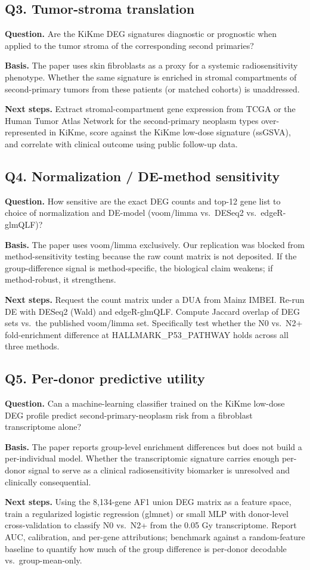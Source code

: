 \subsection*{Q3. Tumor-stroma translation}
\textbf{Question.} Are the KiKme DEG signatures diagnostic or prognostic when applied to the tumor stroma of the corresponding second primaries?

\textbf{Basis.} The paper uses skin fibroblasts as a proxy for a systemic radiosensitivity phenotype. Whether the same signature is enriched in stromal compartments of second-primary tumors from these patients (or matched cohorts) is unaddressed.

\textbf{Next steps.} Extract stromal-compartment gene expression from TCGA or the Human Tumor Atlas Network for the second-primary neoplasm types over-represented in KiKme, score against the KiKme low-dose signature (ssGSVA), and correlate with clinical outcome using public follow-up data.

\subsection*{Q4. Normalization / DE-method sensitivity}
\textbf{Question.} How sensitive are the exact DEG counts and top-12 gene list to choice of normalization and DE-model (voom/limma vs.\ DESeq2 vs.\ edgeR-glmQLF)?

\textbf{Basis.} The paper uses voom/limma exclusively. Our replication was blocked from method-sensitivity testing because the raw count matrix is not deposited. If the group-difference signal is method-specific, the biological claim weakens; if method-robust, it strengthens.

\textbf{Next steps.} Request the count matrix under a DUA from Mainz IMBEI. Re-run DE with DESeq2 (Wald) and edgeR-glmQLF. Compute Jaccard overlap of DEG sets vs.\ the published voom/limma set. Specifically test whether the N0 vs.\ N2+ fold-enrichment difference at HALLMARK\_P53\_PATHWAY holds across all three methods.

\subsection*{Q5. Per-donor predictive utility}
\textbf{Question.} Can a machine-learning classifier trained on the KiKme low-dose DEG profile predict second-primary-neoplasm risk from a fibroblast transcriptome alone?

\textbf{Basis.} The paper reports group-level enrichment differences but does not build a per-individual model. Whether the transcriptomic signature carries enough per-donor signal to serve as a clinical radiosensitivity biomarker is unresolved and clinically consequential.

\textbf{Next steps.} Using the 8{,}134-gene AF1 union DEG matrix as a feature space, train a regularized logistic regression (glmnet) or small MLP with donor-level cross-validation to classify N0 vs.\ N2+ from the 0.05 Gy transcriptome. Report AUC, calibration, and per-gene attributions; benchmark against a random-feature baseline to quantify how much of the group difference is per-donor decodable vs.\ group-mean-only.
